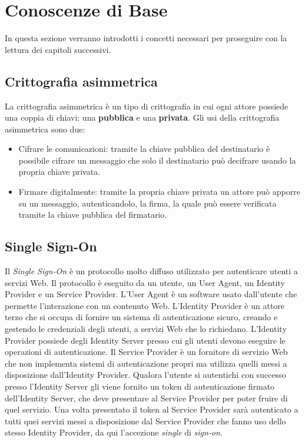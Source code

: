 \chapter{Conoscenze di Base}
\label{conoscenze}

In questa sezione verranno introdotti i concetti necessari per proseguire con la lettura dei capitoli successivi. 

\section{Crittografia asimmetrica}
\label{asimmetrica}

La crittografia asimmetrica è un tipo di crittografia in cui ogni attore possiede una coppia di chiavi: una \textbf{pubblica} e una \textbf{privata}. Gli usi della crittografia asimmetrica sono due:
\begin{itemize}
	\item Cifrare le comunicazioni: tramite la chiave pubblica del destinatario è possibile cifrare un messaggio che solo il destinatario può decifrare usando la propria chiave privata.
	\item Firmare digitalmente: tramite la propria chiave privata un attore può apporre su un messaggio, autenticandolo, la firma, la quale può essere verificata tramite la chiave pubblica del firmatario.
\end{itemize}

\section{Single Sign-On}
\label{sso}


Il \emph{Single Sign-On} è un protocollo molto diffuso utilizzato per autenticare utenti a servizi Web. Il protocollo è eseguito da un utente, un User Agent, un Identity Provider e un Service Provider. L'User Agent è un software usato dall'utente che permette l'interazione con un contenuto Web. L'Identity Provider è un attore terzo che si occupa di fornire un sistema di autenticazione sicuro, creando e gestendo le credenziali degli utenti, a servizi Web che lo richiedano. L'Identity Provider possiede degli Identity Server presso cui gli utenti devono eseguire le operazioni di autenticazione. Il Service Provider è un fornitore di servizio Web che non implementa sistemi di autenticazione propri ma utilizza quelli messi a disposizione dall'Identity Provider. Qualora l'utente si autentichi con successo presso l'Identity Server gli viene fornito un token di autenticazione firmato dell'Identity Server, che deve presentare al Service Provider per poter fruire di quel servizio.  Una volta presentato il token al Service Provider sarà autenticato a tutti quei servizi messi a disposizione dal Service Provider che fanno uso dello stesso Identity Provider, da qui l'accezione \emph{single} di \emph{sign-on}.

